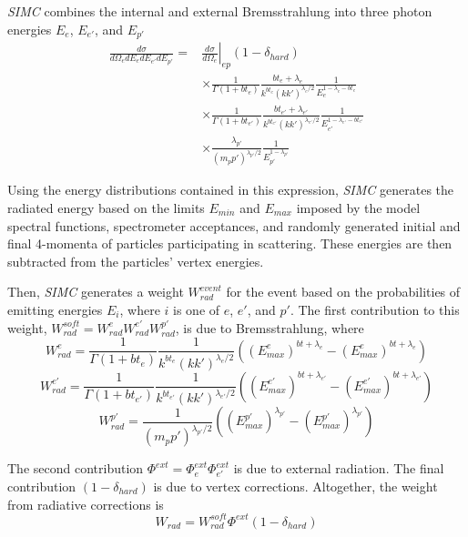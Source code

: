 \textit{SIMC} combines the internal and external Bremsstrahlung into three
photon energies $E_e$, $E_{e'}$, and $E_{p'}$
\begin{align}
\frac{d\sigma}{d\Omega_{e} dE_{e} dE_{e'} dE_{p'}} =&\left.\frac{d\sigma}{d\Omega_{e}}\right|_{ep} \left(1-\delta_{hard}\right) \\
    &\times \frac{1}{\Gamma\left(1+b t_{e}\right)}  \frac{bt_{e}  + \lambda_{e}} {k^{bt_{e}} (kk')^{\lambda_{e}/2}}  \frac{1}{E_{e}^{1 -\lambda_{e} -bt_{e}}} \\
    &\times \frac{1}{\Gamma\left(1+b t_{e'}\right)} \frac{bt_{e'} + \lambda_{e'}}{k^{bt_{e'}}(kk')^{\lambda_{e'}/2}} \frac{1}{E_{e'}^{1-\lambda_{e'}-bt_{e'}}} \\
    &\times \frac{\lambda_{p'}}{(m_p p')^{\lambda_{p'}/2}} \frac{1}{E_{p'}^{1-\lambda_{p'}}}
\end{align}

Using the energy distributions contained in this expression,
\textit{SIMC} generates the radiated energy based on the limits
$E_{min}$ and $E_{max}$
imposed by
the model spectral functions,
spectrometer acceptances,
and randomly generated initial and final 4-momenta of particles participating
in scattering.
These energies are then subtracted from the particles' vertex energies.


Then, \textit{SIMC} generates a weight $W^{event}_{rad}$ for the event based on the
probabilities of emitting energies $E_i$, where $i$ is one of $e$, $e'$, and
$p'$.
The first contribution to this weight,
$W^{soft}_{rad}=W^{e}_{rad}W^{e'}_{rad}W^{p'}_{rad}$, is due to Bremsstrahlung,
where
\begin{equation}
    W^{e}_{rad} = \frac{1}{\Gamma(1+bt_{e})} \frac{1}{k^{bt_{e}}(kk')^{\lambda_{e}/2}}
                \left((E^{e}_{max})^{bt+\lambda_{e}}-(E^{e}_{max})^{bt+\lambda_{e}}\right)
\end{equation}
\begin{equation}
    W^{e'}_{rad} = \frac{1}{\Gamma(1+bt_{e'})} \frac{1}{k^{bt_{e'}}(kk')^{\lambda_{e'}/2}}
                \left((E^{e'}_{max})^{bt+\lambda_{e'}}-(E^{e'}_{max})^{bt+\lambda_{e'}}\right)
\end{equation}
\begin{equation}
    W^{p'}_{rad} =  \frac{1}{(m_p p')^{\lambda_{p'}/2}}
                \left((E^{p'}_{max})^{\lambda_{p'}}-(E^{p'}_{max})^{\lambda_{p'}}\right)
\end{equation}

The second contribution $\Phi^{ext}=\Phi^{ext}_{e}\Phi^{ext}_{e'}$
is due to external radiation.
The final contribution $(1-\delta_{hard})$ is due to vertex corrections.
Altogether, the weight from radiative corrections is
\begin{equation}
    W_{rad} = W^{soft}_{rad} \Phi^{ext} (1-\delta_{hard})
\end{equation}


